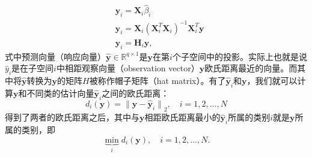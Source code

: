 \documentclass[UTF8]{ctexart}
\begin{document}
\begin{equation}\label{eq-4}
    \begin{split}
        & \hat{\mathbf{y}}_i={\mathbf{X}_i\hat{\beta}_i}\\
        & \hat{\mathbf{y}}_i={\mathbf{X}_i{(\mathbf{X}^T_i\mathbf{X}_i)}^{-1}{\mathbf{X}^T_i\mathbf{y}}}\\
        & {\hat{\mathbf{y}}_i}={\mathbf{H}_i\mathbf{y}},
    \end{split}
\end{equation}
式中预测向量（响应向量）\(\hat{\mathbf{y}}\in\mathbb{R}^{q \times 1}\)是\(\mathbf{y}\)在第\(i\)个子空间中的投影。实际上也就是说\(\hat{y}_i\)是在子空间\(i\)中相距观察向量（observation vector）\(\mathbf{y}\)欧氏距离最近的向量。而其中将\(\hat{\mathbf{y}}\)转换为\(\mathbf{y}\)的矩阵\(H\)被称作帽子矩阵（hat matrix）。有了\(\hat{\mathbf{y}}_i\)和\(\mathbf{y}\)，我们就可以计算\(\mathbf{y}\)和不同类的估计向量\({\hat{\mathbf{y}}}_i\)之间的欧氏距离：
\begin{equation}\label{eq-5}
    d_i(\mathbf{y})={\|\mathbf{y}-{\hat{\mathbf{y}}}_i\|}_2,\quad i=1,2,\dots,N
\end{equation}
得到了两者的欧氏距离之后，其中与\(\mathbf{y}\)相距欧氏距离最小的\(\hat{\mathbf{y}}_i\)所属的类别\(i\)就是\(\mathbf{y}\)所属的类别，即
\begin{equation}
    \underbrace{\min}_i d_i(\mathbf{y}),\quad i=1,2,\dots,N.
\end{equation}
\end{document}
